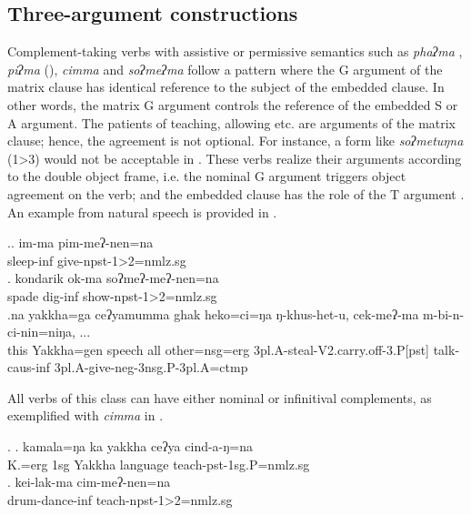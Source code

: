 \subsection{Three-argument constructions}	
		
 Complement-taking  verbs with assistive or permissive semantics such as \emph{phaʔma} , \emph{piʔma}  (), \emph{cimma}  and \emph{soʔmeʔma}  follow a pattern where the G argument of the matrix clause has identical reference to the subject of the embedded clause. In other words, the matrix G argument controls the reference of the embedded S or A argument. The patients of teaching, allowing etc. are arguments of the  matrix clause; hence, the agreement is not optional. For instance, a form like \emph{soʔmetuŋna} (1>3) would not be acceptable in \Next[b]. 
 These verbs realize their arguments according to the double object frame, i.e. the nominal G argument triggers object agreement on the verb; and the embedded clause has the role of the T argument \Next. An example from natural speech is provided in \Next[c]. 
 

\ex.\ag. im-ma pim-meʔ-nen=na\\
	sleep-{\sc inf} give-{\sc npst-1>2=nmlz.sg}\\
	\bg. kondarik ok-ma soʔmeʔ-meʔ-nen=na\\
	spade dig{\sc -inf} show{\sc -npst-1>2=nmlz.sg}		\\
	\bg.na   yakkha=ga ceʔyamumma ghak     heko=ci=ŋa      ŋ-khus-het-u, cek-meʔ-ma m-bi-n-ci-nin=niŋa,  ...  \\
this Yakkha{\sc =gen}  speech all other{\sc =nsg=erg} {\sc 3pl.A-}steal{\sc -V2.carry.off-3.P[pst]} talk{\sc -caus-inf} {\sc 3pl.A-}give{\sc -neg-3nsg.P-3pl.A=ctmp} \\
 
	
	
All verbs of this class can have either nominal or infinitival complements, as exemplified with \emph{cimma}  in \Next.

\ex. \ag. kamala=ŋa ka yakkha ceʔya cind-a-ŋ=na\\
		K.{\sc =erg} {\sc 1sg} Yakkha language teach{\sc [3sg.A]-pst-1sg.P=nmlz.sg}	\\
 	\bg. kei-lak-ma cim-meʔ-nen=na\\
	drum-dance-{\sc inf} teach{\sc -npst-1>2=nmlz.sg}\\

